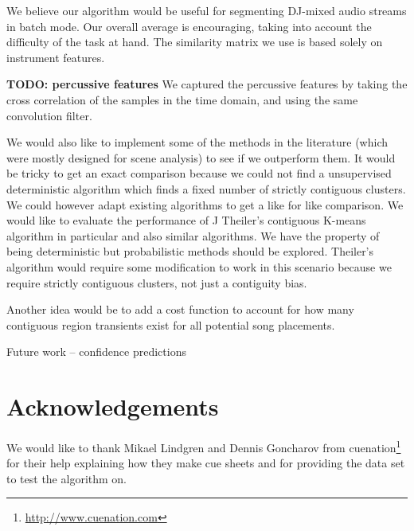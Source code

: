 \documentclass[twocolumn]{article}
\begin{document}
We believe our algorithm would be useful for segmenting DJ-mixed audio streams in batch mode. Our overall average is encouraging, taking into account the difficulty of the task at hand. The similarity matrix we use is based solely on instrument features. 

\textbf{TODO: percussive features}
We captured the percussive features by taking the cross correlation of the samples in the time domain, and using the same convolution filter. 

We would also like to implement some of the methods in the literature (which were mostly designed for scene analysis) to see if we outperform them. It would be tricky to get an exact comparison because we could not find a unsupervised deterministic algorithm which finds a fixed number of strictly contiguous clusters. We could however adapt existing algorithms to get a like for like comparison. We would like to evaluate the performance of J Theiler's contiguous K-means algorithm in particular \cite{theiler1997contiguity} and also similar algorithms. We have the property of being deterministic but probabilistic methods should be explored. Theiler's algorithm would require some modification to work in this scenario because we require strictly contiguous clusters, not just a contiguity bias. 

Another idea would be to add a cost function to account for how many contiguous region transients exist for all potential song placements. 

Future work -- confidence predictions

\section{Acknowledgements}\label{sec:acknowledgements}

We would like to thank Mikael Lindgren and Dennis Goncharov from cuenation\footnote{\url{http://www.cuenation.com}} for their help explaining how they make cue sheets and for providing the data set to test the algorithm on.




\end{document}
